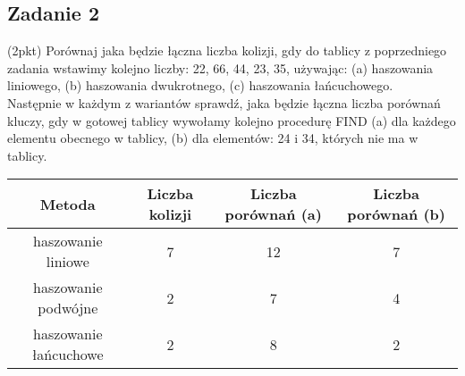 \documentclass{article}
\begin{document}
\subsection*{Zadanie 2}
(2pkt) Porównaj jaka będzie łączna liczba kolizji, gdy do tablicy z poprzedniego zadania wstawimy kolejno liczby:
22, 66, 44, 23, 35,  używając: (a) haszowania liniowego, (b) haszowania dwukrotnego, (c) haszowania łańcuchowego. \\[1ex]
\noindent
Następnie w każdym z wariantów sprawdź, jaka będzie łączna liczba porównań kluczy, gdy w gotowej tablicy wywołamy
kolejno procedurę FIND (a) dla każdego elementu obecnego w tablicy, (b) dla elementów: 24 i 34, których nie ma w tablicy.
\begin{center}
    \begin{tabular}{c|c|c|c}
        \textbf{Metoda}       & \textbf{Liczba kolizji} & \textbf{Liczba porównań (a)} & \textbf{Liczba porównań (b)} \\
        \hline
        haszowanie liniowe    & 7                       & 12                           & 7                            \\
        haszowanie podwójne   & 2                       & 7                            & 4                            \\
        haszowanie łańcuchowe & 2                       & 8                            & 2
    \end{tabular}
\end{center}

\pagebreak
\end{document}
